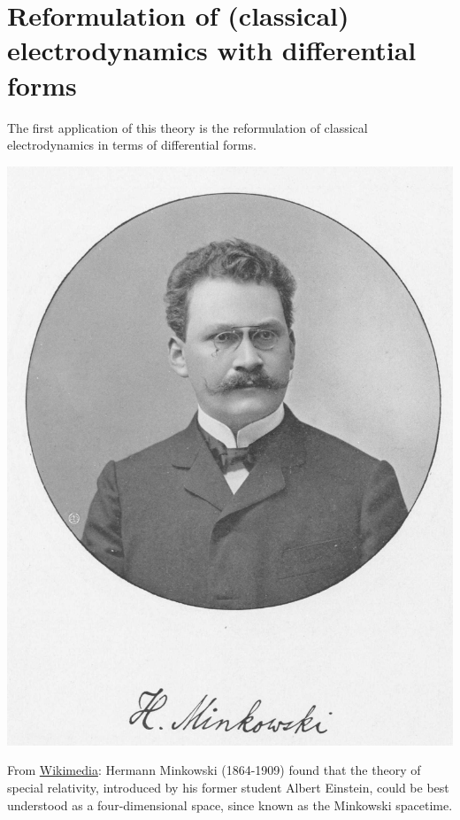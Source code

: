 \documentclass[../main.tex]{subfiles}
\begin{document}
\section[Reformulation of electrodynamics with differential forms]{Reformulation of (classical) electrodynamics with differential forms}
The first application of this theory is the reformulation of classical electrodynamics in terms of differential forms.
\begin{marginfigure}
	\includegraphics[width=1\linewidth]{images/De_Raum_zeit_Minkowski_Bild.jpg}
	\caption{From \href{https://commons.wikimedia.org/wiki/File:De_Raum_zeit_Minkowski_Bild.jpg}{Wikimedia}: Hermann Minkowski (1864-1909) found that the theory of special relativity, introduced by his former student Albert Einstein, could be best understood as a four-dimensional space, since known as the Minkowski spacetime.}
\end{marginfigure}
\end{document}
